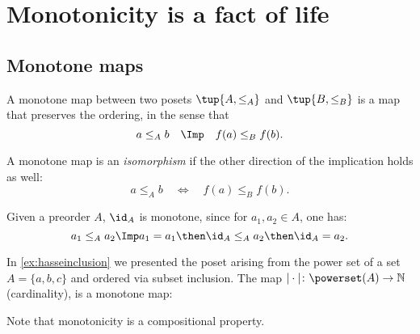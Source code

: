 \section{Monotonicity is a fact of life}
\subsection{Monotone maps}
\begin{definition}
A monotone map between two posets
$\tup{A, \leq_A}$ and $\tup{B, \leq_B}$ is a map that preserves the ordering, in the sense that 
\begin{equation}
 a \leq_A b \quad \Imp \quad f(a) \leq_B f(b).
\end{equation}

A monotone map is an \emph{isomorphism} if the other direction
of the implication holds as well:
\begin{equation}
 a \leq_A b \quad \Leftrightarrow \quad f(a) \leq_B f(b).
\end{equation}
\end{definition}

\begin{remark}
Given a preorder $A$, $\id_A$ is monotone, since for $a_1,a_2\in A$, one has:
\begin{equation}
a_1\leq_A a_2 \Imp a_1=a_1\then \id_A \leq_A a_2\then \id_A = a_2.
\end{equation}
\end{remark}



\begin{example}
In \cref{ex:hasseinclusion} we presented the poset arising from the power set of a set $A=\{a,b,c\}$ and ordered via subset inclusion. The map $\vert \cdot \vert \colon \powerset(A)\to \mathbb{N}$ (cardinality), is a monotone map:
\begin{center}
\end{center}
\end{example}
Note that monotonicity is a compositional property.

